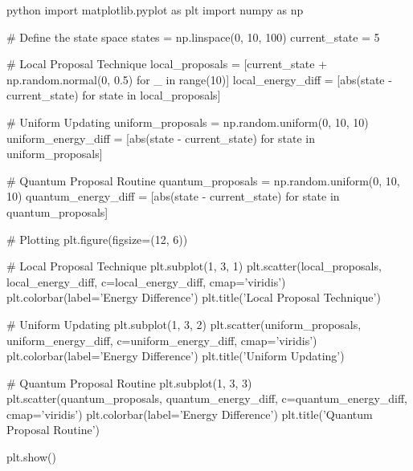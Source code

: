 python
import matplotlib.pyplot as plt
import numpy as np

# Define the state space
states = np.linspace(0, 10, 100)
current_state = 5

# Local Proposal Technique
local_proposals = [current_state + np.random.normal(0, 0.5) for _ in range(10)]
local_energy_diff = [abs(state - current_state) for state in local_proposals]

# Uniform Updating
uniform_proposals = np.random.uniform(0, 10, 10)
uniform_energy_diff = [abs(state - current_state) for state in uniform_proposals]

# Quantum Proposal Routine
quantum_proposals = np.random.uniform(0, 10, 10)
quantum_energy_diff = [abs(state - current_state) for state in quantum_proposals]

# Plotting
plt.figure(figsize=(12, 6))

# Local Proposal Technique
plt.subplot(1, 3, 1)
plt.scatter(local_proposals, local_energy_diff, c=local_energy_diff, cmap='viridis')
plt.colorbar(label='Energy Difference')
plt.title('Local Proposal Technique')

# Uniform Updating
plt.subplot(1, 3, 2)
plt.scatter(uniform_proposals, uniform_energy_diff, c=uniform_energy_diff, cmap='viridis')
plt.colorbar(label='Energy Difference')
plt.title('Uniform Updating')

# Quantum Proposal Routine
plt.subplot(1, 3, 3)
plt.scatter(quantum_proposals, quantum_energy_diff, c=quantum_energy_diff, cmap='viridis')
plt.colorbar(label='Energy Difference')
plt.title('Quantum Proposal Routine')

plt.show()